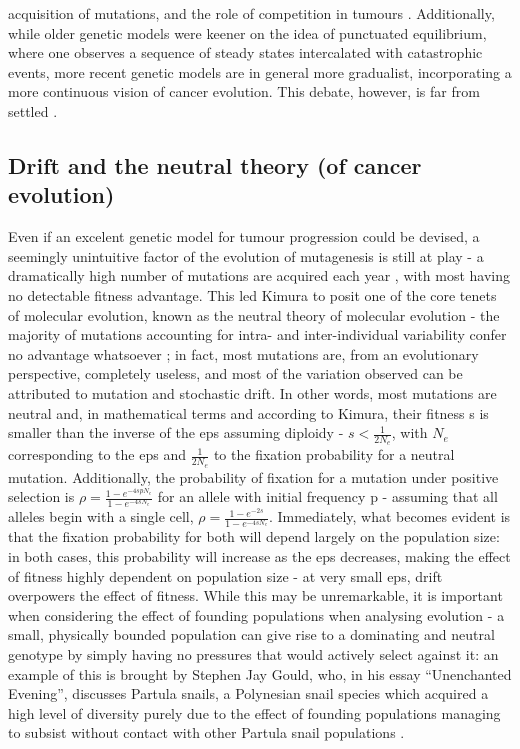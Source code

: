 acquisition of mutations, and the role of competition in tumours \cite{Cannataro2018-ye,Schwartz2017-hg}. Additionally, while older genetic models were keener on the idea of punctuated equilibrium, where one observes a sequence of steady states intercalated with catastrophic events, more recent genetic models are in general more gradualist, incorporating a more continuous vision of cancer evolution. This debate, however, is far from settled \cite{Beerenwinkel2015-xr,Sterelny2007-kp}.

\subsection{Drift and the neutral theory (of cancer evolution)}

Even if an excelent genetic model for tumour progression could be devised, a seemingly unintuitive factor of the evolution of mutagenesis is still at play - a dramatically high number of mutations are acquired each year \cite{Kimura1968-xd}, with most having no detectable fitness advantage. This led Kimura to posit one of the core tenets of molecular evolution, known as the neutral theory of molecular evolution - the majority of mutations accounting for intra- and inter-individual variability confer no advantage whatsoever \cite{Kimura1979-ps}; in fact, most mutations are, from an evolutionary perspective, completely useless, and most of the variation observed can be attributed to mutation and stochastic drift. In other words, most mutations are neutral and, in mathematical terms and according to Kimura, their fitness s is smaller than the inverse of the \ac{eps} assuming diploidy - $s<\frac{1}{2N_e}$, with $N_e$ corresponding to the \ac{eps} and $\frac{1}{2N_e}$ to the fixation probability for a neutral mutation. Additionally, the probability of fixation for a mutation under positive selection is $\rho = \frac{1-e^{-4spN_e}}{1-e^{-4sN_e}}$ for an allele with initial frequency p \cite{Kimura1962-df} - assuming that all alleles begin with a single cell, $\rho = \frac{1-e^{-2s}}{1-e^{-4sN_e}}$. Immediately, what becomes evident is that the fixation probability for both will depend largely on the population size: in both cases, this probability will increase as the \ac{eps} decreases, making the effect of fitness highly dependent on population size - at very small \ac{eps}, drift overpowers the effect of fitness. While this may be unremarkable, it is important when considering the effect of founding populations when analysing evolution - a small, physically bounded population can give rise to a dominating and neutral genotype by simply having no pressures that would actively select against it: an example of this is brought by Stephen Jay Gould, who, in his essay “Unenchanted Evening”, discusses Partula snails, a Polynesian snail species which acquired a high level of diversity purely due to the effect of founding populations managing to subsist without contact with other Partula snail populations \cite{Gould1995-yr}.

